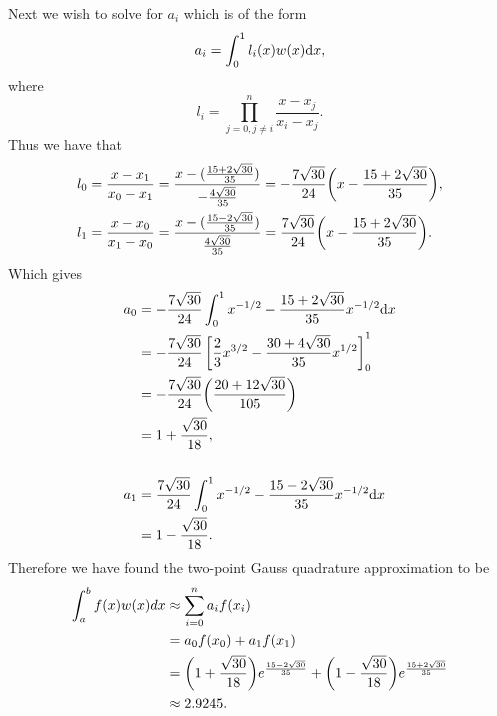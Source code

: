 \documentclass[12pt]{report}
\begin{document}
\begin{solution}
\[    \]
    Next we wish to solve for $a_i$ which is of the form
    \[ 
        a_i = \int_0^1 l_i(x)w(x)\mathrm{d}x,
    \]
    where
    \[ 
        l_i = \prod_{j=0, j\neq i}^{n} \frac{x - x_j}{x_i - x_j}.
    \]
    Thus we have that
    \begin{align*}
        l_0 &= \frac{x - x_1}{x_0 - x_1} = \frac{x - (\frac{15 + 2\sqrt{30}}{35})}{-\frac{4\sqrt{30}}{35}} = - \frac{7\sqrt{30}}{24}{\left(x - \frac{15 + 2\sqrt{30}}{35}\right)},\\
        l_1 &= \frac{x - x_0}{x_1 - x_0} = \frac{x - (\frac{15 - 2\sqrt{30}}{35})}{\frac{4\sqrt{30}}{35}} = \frac{7\sqrt{30}}{24}{\left(x - \frac{15 + 2\sqrt{30}}{35}\right)}.
    \end{align*}
    Which gives
    \begin{align*}
        a_0 &= - \frac{7\sqrt{30}}{24} \int_0^1 x^{-1/2} - \frac{15 + 2\sqrt{30}}{35}x^{-1/2}\mathrm{d}x \\
        &= - \frac{7\sqrt{30}}{24} \left[ \frac{2}{3}x^{3/2} - \frac{30 + 4\sqrt{30}}{35}x^{1/2} \right]_0^1\\
        &= - \frac{7\sqrt{30}}{24}{\left(\frac{20 + 12\sqrt{30}}{105}\right)}\\
        &= 1 + \frac{\sqrt{30}}{18},\\
        \\
        a_1 &= \frac{7\sqrt{30}}{24} \int_0^1 x^{-1/2} - \frac{15 - 2\sqrt{30}}{35}x^{-1/2}\mathrm{d}x \\
        &= 1 - \frac{\sqrt{30}}{18}.
    \end{align*}
    Therefore we have found the two-point Gauss quadrature approximation to be 
    \begin{align*}
        \int_a^b f(x)w(x)dx &\approx \sum_{i=0}^{n}a_if(x_i)\\
        &= a_0 f(x_0) + a_1 f(x_1)\\
        &=  {\left(1 + \frac{\sqrt{30}}{18}\right)}e^{\frac{15 - 2\sqrt{30}}{35}} + {\left(1 - \frac{\sqrt{30}}{18}\right)}e^{\frac{15 + 2\sqrt{30}}{35}}\\
        &\approx 2.9245.
    \end{align*} 

\end{solution}

\newpage


\end{document}
